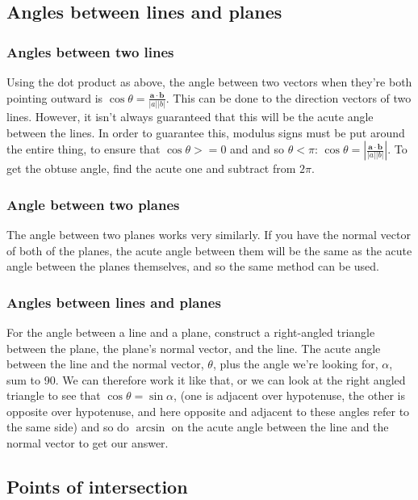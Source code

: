 \subsection{Angles between lines and planes}
\subsubsection{Angles between two lines}
Using the dot product as above, the angle between two vectors when they're both pointing outward is $\cos\theta = \frac{\mathbf{a} \cdot \mathbf{b}}{|a||b|}$. This can be done to the direction vectors of two lines. However, it isn't always guaranteed that this will be the acute angle between the lines. In order to guarantee this, modulus signs must be put around the entire thing, to ensure that $\cos\theta>=0$ and and so $\theta<\pi$: $\cos\theta = |\frac{\mathbf{a} \cdot \mathbf{b}}{|a||b|}|$. To get the obtuse angle, find the acute one and subtract from $2\pi$.

\subsubsection{Angle between two planes}
The angle between two planes works very similarly. If you have the normal vector of both of the planes, the acute angle between them will be the same as the acute angle between the planes themselves, and so the same method can be used.

\subsubsection{Angles between lines and planes}
For the angle between a line and a plane, construct a right-angled triangle between the plane, the plane's normal vector, and the line. The acute angle between the line and the normal vector, $\theta$, plus the angle we're looking for, $\alpha$, sum to 90\textdegree. We can therefore work it like that, or we can look at the right angled triangle to see that $\cos\theta = \sin\alpha$, (one is adjacent over hypotenuse, the other is opposite over hypotenuse, and here opposite and adjacent to these angles refer to the same side) and so do $\arcsin$ on the acute angle between the line and the normal vector to get our answer.

\subsection{Points of intersection}
